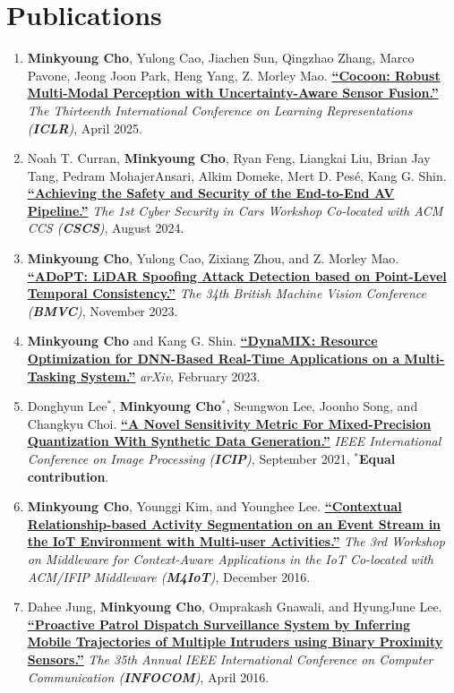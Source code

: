 \documentclass[letterpaper,oneside,11pt]{article}
\begin{document}
\section{Publications}
\begin{enumerate}[leftmargin=*, itemsep=0em]
  \item \small \textbf{Minkyoung Cho}, Yulong Cao, Jiachen Sun, Qingzhao Zhang, Marco Pavone, Jeong Joon Park, Heng Yang, Z. Morley Mao. \textbf{\href{https://minkyoungcho.github.io/research/}{``Cocoon: Robust Multi-Modal Perception with
  Uncertainty-Aware Sensor Fusion.''}} \textit{The Thirteenth International Conference on Learning Representations (\textbf{ICLR})}, April 2025.
  \item \small Noah T. Curran, \textbf{Minkyoung Cho}, Ryan Feng, Liangkai Liu, Brian Jay Tang, Pedram MohajerAnsari, Alkim Domeke, Mert D. Pesé, Kang G. Shin. \textbf{\href{https://minkyoungcho.github.io/research/}{``Achieving the Safety and Security of the End-to-End AV Pipeline.''}} \textit{The 1st Cyber Security in Cars Workshop Co-located with ACM CCS (\textbf{CSCS})}, August 2024.
  \item \small \textbf{Minkyoung Cho}, Yulong Cao, Zixiang Zhou, and Z. Morley Mao.  \textbf{\href{https://arxiv.org/abs/2310.14504}{``ADoPT: LiDAR Spoofing Attack Detection based on Point-Level Temporal Consistency.''}} \textit{The 34th British Machine Vision Conference (\textbf{BMVC})}, November 2023.
  \item \small \textbf{Minkyoung Cho} and Kang G. Shin.  \textbf{\href{https://arxiv.org/abs/2302.01568}{``DynaMIX: Resource Optimization for DNN-Based Real-Time Applications on a Multi-Tasking System.''}} \textit{arXiv}, February 2023.
  \item \small Donghyun Lee$^\ast$, \textbf{Minkyoung Cho$^\ast$}, Seungwon Lee, Joonho Song, and Changkyu Choi.  \textbf{\href{https://ieeexplore.ieee.org/abstract/document/9506527}{``A Novel Sensitivity Metric For Mixed-Precision Quantization With Synthetic Data Generation.''}} \textit{IEEE International Conference on Image Processing (\textbf{ICIP})}, September 2021, $^\ast$\textbf{Equal contribution}.
  \item \small \textbf{Minkyoung Cho}, Younggi Kim, and Younghee Lee. \textbf{\href{https://dl.acm.org/doi/10.1145/3008631.3008633}{``Contextual Relationship-based Activity Segmentation on an Event Stream in the IoT Environment with Multi-user Activities.''}} \textit{The 3rd Workshop on Middleware for Context-Aware Applications in the IoT Co-located with ACM/IFIP Middleware (\textbf{M4IoT})}, December 2016.
  \item \small Dahee Jung, \textbf{Minkyoung Cho}, Omprakash Gnawali, and HyungJune Lee. \textbf{\href{https://ieeexplore.ieee.org/abstract/document/7524369}{``Proactive Patrol Dispatch Surveillance System by Inferring Mobile Trajectories of Multiple Intruders using Binary Proximity Sensors.''}} \textit{The 35th Annual IEEE International Conference on Computer Communication (\textbf{INFOCOM})}, April 2016.
\end{enumerate}
\end{document}

